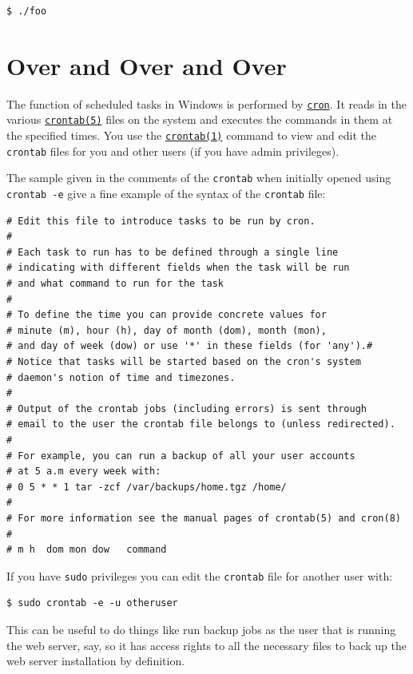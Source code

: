 \documentclass[10pt,]{book}
\numberwithin{figure}{chapter}
\begin{document}
\begin{verbatim}
$ ./foo
\end{verbatim}

\section{Over and Over and Over}\label{over-and-over-and-over}

The function of scheduled tasks in Windows is performed by
\href{http://linux.die.net/man/8/cron}{\texttt{cron}}. It reads in the
various \href{http://linux.die.net/man/5/crontab}{\texttt{crontab(5)}}
files on the system and executes the commands in them at the specified
times. You use the
\href{http://linux.die.net/man/1/crontab}{\texttt{crontab(1)}} command
to view and edit the \texttt{crontab} files for you and other users (if
you have admin privileges).

The sample given in the comments of the \texttt{crontab} when initially
opened using \texttt{crontab -e} give a fine example of the syntax of
the \texttt{crontab} file:

\begin{verbatim}
# Edit this file to introduce tasks to be run by cron.
#
# Each task to run has to be defined through a single line
# indicating with different fields when the task will be run
# and what command to run for the task
#
# To define the time you can provide concrete values for
# minute (m), hour (h), day of month (dom), month (mon),
# and day of week (dow) or use '*' in these fields (for 'any').#
# Notice that tasks will be started based on the cron's system
# daemon's notion of time and timezones.
#
# Output of the crontab jobs (including errors) is sent through
# email to the user the crontab file belongs to (unless redirected).
#
# For example, you can run a backup of all your user accounts
# at 5 a.m every week with:
# 0 5 * * 1 tar -zcf /var/backups/home.tgz /home/
#
# For more information see the manual pages of crontab(5) and cron(8)
#
# m h  dom mon dow   command
\end{verbatim}

If you have \texttt{sudo} privileges you can edit the \texttt{crontab}
file for another user with:

\begin{verbatim}
$ sudo crontab -e -u otheruser
\end{verbatim}

This can be useful to do things like run backup jobs as the user that is
running the web server, say, so it has access rights to all the
necessary files to back up the web server installation by definition.
\end{document}
